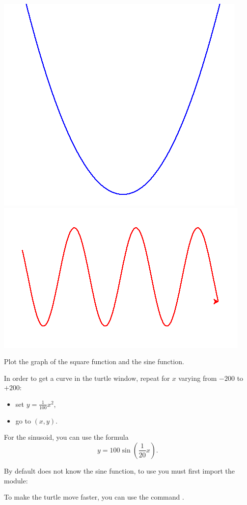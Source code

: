 \documentclass[11pt,class=report,crop=false]{standalone}
\begin{document}

\begin{activite}


\begin{center}
\includegraphics[scale=\myscale,scale=0.4]{screen-turtle-3a}
\includegraphics[scale=\myscale,scale=0.4]{screen-turtle-3b}
\end{center}

Plot the graph of the square function and the sine function.

In order to get a curve in the turtle window, repeat for $x$ varying from $-200$ to $+200$:
\begin{itemize}
  \item set $y = \frac{1}{100} x^2$,
  \item go to $(x,y)$.
\end{itemize}

For the sinusoid, you can use the formula 
$$y = 100\sin\left(\frac{1}{20}x\right).$$
  
By default \Python{} does not know the sine function, to use  you must first import the  module:

To make the turtle move faster, you can use the command .
\end{activite}
\end{document}
